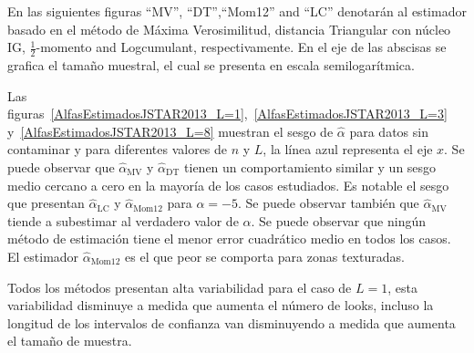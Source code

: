 En las siguientes figuras ``MV'', ``DT'',``Mom12'' and ``LC'' denotarán al estimador basado en el método de Máxima Verosimilitud, distancia Triangular con núcleo IG, $\frac{1}{2}$-momento and Logcumulant, respectivamente. En el eje de las abscisas se grafica el tamaño muestral, el cual se presenta en escala semilogarítmica.

Las figuras~\ref{AlfasEstimadosJSTAR2013_L=1},~\ref{AlfasEstimadosJSTAR2013_L=3} y~\ref{AlfasEstimadosJSTAR2013_L=8} muestran el sesgo de $\widehat{\alpha}$ para datos sin contaminar y para diferentes valores de $n$ y $L$, la línea azul representa el eje $x$. Se puede observar que $\widehat{\alpha}_{\text{MV}}$ y $\widehat{\alpha}_{\text{DT}}$ tienen un comportamiento similar y un sesgo medio cercano a cero en la mayoría de los casos estudiados. Es notable el sesgo que presentan  $\widehat{\alpha}_{\text{LC}}$ y $\widehat{\alpha}_{\text{Mom12}}$ para $\alpha=-5$. Se puede observar también que $\widehat\alpha_{\text{MV}}$ tiende a subestimar al verdadero valor de $\alpha$.
Se puede observar que ningún método de estimación tiene el menor error cuadrático medio en todos los casos. El estimador $\widehat{\alpha}_{\text{Mom12}}$ es el que peor se comporta para zonas texturadas.

Todos los métodos presentan alta variabilidad para el caso de $L=1$, esta variabilidad disminuye a medida que aumenta el número de looks, incluso la longitud de los intervalos de confianza van disminuyendo a medida que aumenta el tamaño de muestra.

